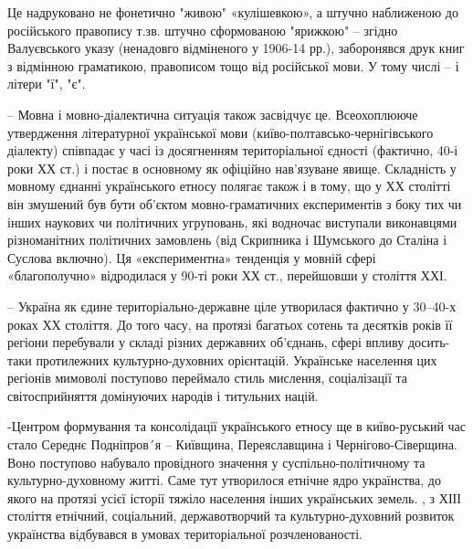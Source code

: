 \begin{itemize}
\begin{itemize}
Це надруковано не фонетично "живою" «кулішевкою», а штучно наближеною до
російського правопису т.зв. штучно сформованою "ярижкою" – згідно Валуєвського
указу (ненадовго відміненого у 1906-14 рр.), заборонявся друк книг з відмінною
граматикою, правописом тощо від російської мови. У тому числі – і літери "ї",
"є".

\end{itemize}

 

– Мовна і мовно-діалектична ситуація також засвідчує це. Всеохоплююче
утвердження літературної української мови (київо-полтавсько-чернігівського
діалекту) співпадає у часі із досягненням територіальної єдності (фактично,
40-і роки ХХ ст.) і постає в основному як офіційно нав’язуване явище.
Складність у мовному єднанні українського етносу полягає також і в тому, що у
ХХ столітті він змушений був бути об’єктом мовно-граматичних експериментів з
боку тих чи інших наукових чи політичних угруповань, які водночас виступали
виконавцями різноманітних політичних замовлень (від Скрипника і Шумського до
Сталіна і Суслова включно). Ця «експериментна» тенденція у мовній сфері
«благополучно» відродилася у 90-ті роки ХХ ст., перейшовши у століття ХХІ.

 

– Україна як єдине територіально-державне ціле утворилася фактично у 30–40-х
роках ХХ століття. До того часу, на протязі багатьох сотень та десятків років
її регіони перебували у складі різних державних об’єднань, сфері впливу
досить-таки протилежних культурно-духовних орієнтацій. Українське населення цих
регіонів мимоволі поступово переймало стиль мислення, соціалізації та
світосприйняття домінуючих народів і титульних націй.

-Центром формування та консолідації українського етносу ще в київо-руський час
стало Середнє Подніпров´я – Київщина, Переяславщина і Чернігово-Сіверщина. Воно
поступово набувало провідного значення у суспільно-політичному та
культурно-духовному житті. Саме тут утворилося етнічне ядро українства, до
якого на протязі усієї історії тяжіло населення інших українських земель.  , з
ХІІІ століття етнічний, соціальний, державотворчий та культурно-духовний
розвиток українства відбувався в умовах територіальної розчленованості.


\end{itemize}
